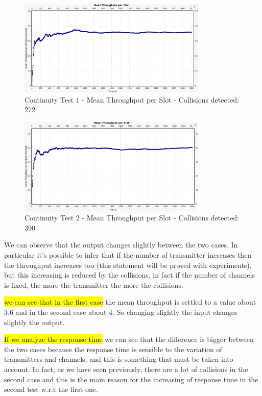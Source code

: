 \begin{figure}[H]
	\centering
	\includegraphics[width=0.8\textwidth]{img/continuityTest1a.png}
	\caption{Continuity Test 1 - Mean Throughput per Slot - Collisions detected: 272}
	\label {img: continuityTest1a}
\end{figure}

\begin{figure}[H]
	\centering
	\includegraphics[width=0.8\textwidth]{img/continuityTest1b.png}
	\caption{Continuity Test 2 - Mean Throughput per Slot - Collisions detected: 390}
	\label {img: continuityTest1b}
\end{figure}

\noindent We can observe that the output changes slightly between the two cases. In particular it's possible to infer that if the number of transmitter increases then the throughput increases too (this statement will be proved with experiments), but this increasing is reduced by the collisions, in fact if the number of channels is fixed, the more the transmitter the more the collisions.

\noindent \colorbox{yellow}{ we can see that in the first case} the mean throughput is settled to a value about 3.6 and in the second case about 4. So changing slightly the input changes slightly the output.

\noindent \colorbox{yellow}{If we analyze the response time} we can see that the difference is bigger between the two cases because the response time is sensible to the variation of transmitters and channels, and this is something that must be taken into account. In fact, as we have seen previously, there are a lot of collisions in the second case and this is the main reason for the increasing of response time in the second test w.r.t the first one.

